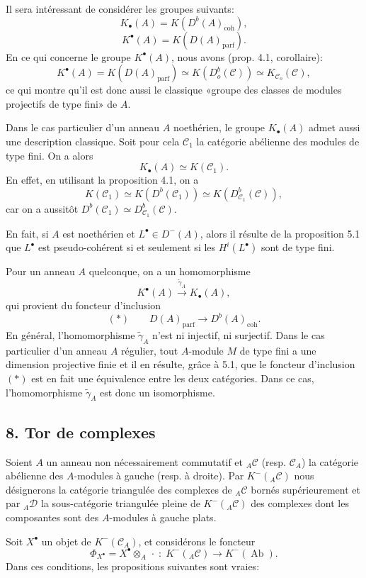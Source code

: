 \documentclass[11pt]{article}
\providecommand{\parf}{\mathrm{parf}}
\providecommand{\coh}{\mathrm{coh}}
\providecommand{\cC}{\mathcal C}
\providecommand{\Ab}{\operatorname{Ab}}
\providecommand{\cC}{\mathcal C}
\providecommand{\cD}{\mathcal D}
\providecommand{\Ab}{\operatorname{Ab}}
\providecommand{\parf}{\mathrm{parf}}
\providecommand{\coh}{\mathrm{coh}}
\begin{document}
Il sera intéressant de considérer les groupes suivants:
\[
K_\bullet(A)=K(D^b(A)_{\coh}),
\]
\[
K^\bullet(A)=K(D(A)_{\parf}).
\]
En ce qui concerne le groupe $K^\bullet(A)$, nous avons (prop. 4.1, corollaire):
\[
K^\bullet(A)=K(D(A)_{\parf})\simeq K(D_o^b(\cC))\simeq K_{\cC_o}(\cC),
\]
ce qui montre qu'il est donc aussi le classique «groupe des classes de modules projectifs de type fini» de $A$.

Dans le cas particulier d'un anneau $A$ noethérien, le groupe $K_\bullet(A)$ admet aussi une description classique. Soit pour cela $\cC_1$ la catégorie abélienne des modules de type fini. On a alors
\[
K_\bullet(A)\simeq K(\cC_1).
\]
En effet, en utilisant la proposition 4.1, on a
\[
K(\cC_1)\simeq K(D^b(\cC_1))\simeq K(D^b_{\cC_1}(\cC)),
\]
car on a aussitôt $D^b(\cC_1)\simeq D^b_{\cC_1}(\cC)$.

En fait, si $A$ est noethérien et $L^\bullet\in D^-(A)$, alors il résulte de la proposition 5.1 que $L^\bullet$ est pseudo-cohérent si et seulement si les $H^i(L^\bullet)$ sont de type fini.

Pour un anneau $A$ quelconque, on a un homomorphisme
\[
K^{\bullet}(A)\xrightarrow{\widetilde\gamma_A}K_\bullet(A),
\]
qui provient du foncteur d'inclusion
\[
(*)\qquad D(A)_{\parf}\longrightarrow D^b(A)_{\coh}.
\]
En général, l'homomorphisme $\widetilde\gamma_A$ n'est ni injectif, ni surjectif. Dans le cas particulier d'un anneau $A$ régulier, tout $A$-module $M$ de type fini a une dimension projective finie et il en résulte, grâce à 5.1, que le foncteur d'inclusion $(*)$ est en fait une équivalence entre les deux catégories. Dans ce cas, l'homomorphisme $\widetilde\gamma_A$ est donc un isomorphisme.

\subsection*{8. Tor de complexes}

Soient $A$ un anneau non nécessairement commutatif et ${}_A\cC$ (resp. $\cC_A$) la catégorie abélienne des $A$-modules à gauche (resp. à droite). Par $K^-({}_A\cC)$ nous désignerons la catégorie triangulée des complexes de ${}_A\cC$ bornés supérieurement et par ${}_A\cD$ la sous-catégorie triangulée pleine de $K^-({}_A\cC)$ des complexes dont les composantes sont des $A$-modules à gauche plats.

Soit $X^\bullet$ un objet de $K^-(\cC_A)$, et considérons le foncteur
\[
\Phi_{X^\bullet}=X^\bullet\otimes_A\,\cdot\;:\;K^-({}_A\cC)\longrightarrow K^-(\Ab).
\]
Dans ces conditions, les propositions suivantes sont vraies:
\end{document}
